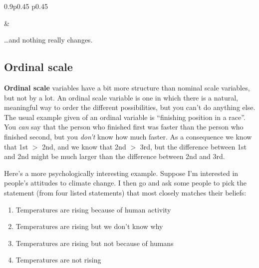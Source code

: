 \documentclass[
  letterpaper,
]{book}
\providecommand{\tightlist}{%
  \setlength{\itemsep}{0pt}\setlength{\parskip}{0pt}}\usepackage{longtable,booktabs,array}
\begin{document}
\begin{table}[ht]
\begin{centerbox}
\begin{threeparttable}
\begin{tabularx}{0.9\textwidth}{p{} p{}}
\hhline{}

 &
 \tabularnewline[-0.5pt]


\end{tabularx} 

\end{threeparttable}\par\end{centerbox}

\end{table}
 

\ldots and nothing really changes.

\hypertarget{ordinal-scale}{%
\subsection{Ordinal scale}\label{ordinal-scale}}

\textbf{Ordinal scale} variables have a bit more structure than nominal
scale variables, but not by a lot. An ordinal scale variable is one in
which there is a natural, meaningful way to order the different
possibilities, but you can't do anything else. The usual example given
of an ordinal variable is ``finishing position in a race''. You
\emph{can} say that the person who finished first was faster than the
person who finished second, but you \emph{don't} know how much faster.
As a consequence we know that 1st \(>\) 2nd, and we know that 2nd \(>\)
3rd, but the difference between 1st and 2nd might be much larger than
the difference between 2nd and 3rd.

Here's a more psychologically interesting example. Suppose I'm
interested in people's attitudes to climate change. I then go and ask
some people to pick the statement (from four listed statements) that
most closely matches their beliefs:

\begin{enumerate}
\def\labelenumi{\arabic{enumi}.}
\tightlist
\item
  Temperatures are rising because of human activity
\item
  Temperatures are rising but we don't know why
\item
  Temperatures are rising but not because of humans
\item
  Temperatures are not rising
\end{enumerate}
\end{document}
